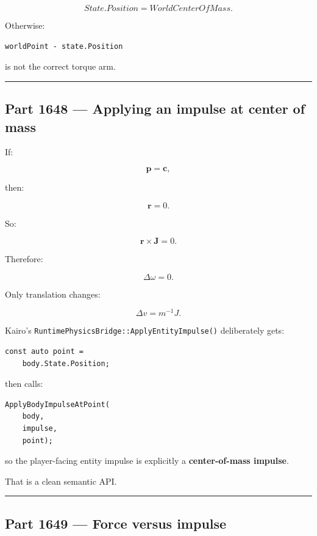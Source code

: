 \[
\boxed{
State.Position
=
WorldCenterOfMass.
}
\]

Otherwise:

\begin{verbatim}
worldPoint - state.Position
\end{verbatim}

is not the correct torque arm.

\begin{center}\rule{0.5\linewidth}{0.5pt}\end{center}

\subsection{Part 1648 --- Applying an impulse at center of mass}\label{06-engine-ii-ch036-part-1648-applying-an-impulse-at-center-of-mass}

If:

\[
\mathbf p=\mathbf c,
\]

then:

\[
\mathbf r=0.
\]

So:

\[
\mathbf r\times\mathbf J=0.
\]

Therefore:

\[
\Delta\omega=0.
\]

Only translation changes:

\[
\boxed{
\Delta v=m^{-1}J.
}
\]

Kairo's \texttt{RuntimePhysicsBridge::ApplyEntityImpulse()} deliberately gets:

\begin{verbatim}
const auto point =
    body.State.Position;
\end{verbatim}

then calls:

\begin{verbatim}
ApplyBodyImpulseAtPoint(
    body,
    impulse,
    point);
\end{verbatim}

so the player-facing entity impulse is explicitly a \textbf{center-of-mass impulse}.

That is a clean semantic API.

\begin{center}\rule{0.5\linewidth}{0.5pt}\end{center}

\subsection{Part 1649 --- Force versus impulse}\label{06-engine-ii-ch036-part-1649-force-versus-impulse}

